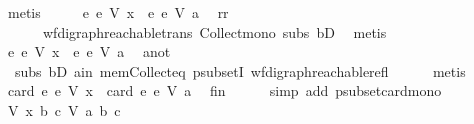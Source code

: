 \begin{isabellebody}
\ metis\isanewline
\ \ \isamarkupfalse%
\ \isamarkupfalse%
\ {\isachardoublequoteopen}{\isacharbraceleft}{\kern0pt}e{\isachardot}{\kern0pt}\ e\ {\isasymrightarrow}\isactrlsup {\isacharasterisk}{\kern0pt}\isactrlbsub V\isactrlesub \ x{\isacharbraceright}{\kern0pt}\ {\isasymsubseteq}\ {\isacharbraceleft}{\kern0pt}e{\isachardot}{\kern0pt}\ e\ {\isasymrightarrow}\isactrlsup {\isacharasterisk}{\kern0pt}\isactrlbsub V\isactrlesub \ a{\isacharbraceright}{\kern0pt}{\isachardoublequoteclose}\ \isamarkupfalse%
\ rr\isanewline
\ \ \ \ \ \ wf{\isacharunderscore}{\kern0pt}digraph{\isachardot}{\kern0pt}reachable{\isacharunderscore}{\kern0pt}trans\ Collect{\isacharunderscore}{\kern0pt}mono\ subs\ bD{}\ \isamarkupfalse%
\ metis\isanewline
\ \ \isamarkupfalse%
\ \isamarkupfalse%
\ {\isachardoublequoteopen}{\isacharbraceleft}{\kern0pt}e{\isachardot}{\kern0pt}\ e\ {\isasymrightarrow}\isactrlsup {\isacharasterisk}{\kern0pt}\isactrlbsub V\isactrlesub \ x{\isacharbraceright}{\kern0pt}\ {\isasymsubset}\ {\isacharbraceleft}{\kern0pt}e{\isachardot}{\kern0pt}\ e\ {\isasymrightarrow}\isactrlsup {\isacharasterisk}{\kern0pt}\isactrlbsub V\isactrlesub \ a{\isacharbraceright}{\kern0pt}{\isachardoublequoteclose}\ \isamarkupfalse%
\ a{\isacharunderscore}{\kern0pt}not\isanewline
\ \ subs\ bD{}\ a{\isacharunderscore}{\kern0pt}in\ mem{\isacharunderscore}{\kern0pt}Collect{\isacharunderscore}{\kern0pt}eq\ psubsetI\ wf{\isacharunderscore}{\kern0pt}digraph{\isachardot}{\kern0pt}reachable{\isacharunderscore}{\kern0pt}refl\isanewline
\ \ \ \ \isamarkupfalse%
\ metis\ \isanewline
\ \ \isamarkupfalse%
\ \isamarkupfalse%
\ {\isachardoublequoteopen}card\ {\isacharbraceleft}{\kern0pt}e{\isachardot}{\kern0pt}\ e\ {\isasymrightarrow}\isactrlsup {\isacharasterisk}{\kern0pt}\isactrlbsub V\isactrlesub \ x{\isacharbraceright}{\kern0pt}\ {\isacharless}{\kern0pt}\ card\ {\isacharbraceleft}{\kern0pt}e{\isachardot}{\kern0pt}\ e\ {\isasymrightarrow}\isactrlsup {\isacharasterisk}{\kern0pt}\isactrlbsub V\isactrlesub \ a{\isacharbraceright}{\kern0pt}{\isachardoublequoteclose}\ \isamarkupfalse%
\ fin\isanewline
\ \ \ \ \isamarkupfalse%
\ {\isacharparenleft}{\kern0pt}simp\ add{\isacharcolon}{\kern0pt}\ psubset{\isacharunderscore}{\kern0pt}card{\isacharunderscore}{\kern0pt}mono{\isacharparenright}{\kern0pt}\isanewline
\ \ \isamarkupfalse%
\ \isamarkupfalse%
\ {\isachardoublequoteopen}{\isacharparenleft}{\kern0pt}{\isacharparenleft}{\kern0pt}V{\isacharcomma}{\kern0pt}\ x{\isacharcomma}{\kern0pt}\ b{\isacharcomma}{\kern0pt}\ c{\isacharparenright}{\kern0pt}{\isacharcomma}{\kern0pt}\ V{\isacharcomma}{\kern0pt}\ a{\isacharcomma}{\kern0pt}\ b{\isacharcomma}{\kern0pt}\ c{\isacharparenright}{\kern0pt}\isanewline

\end{isabellebody}
